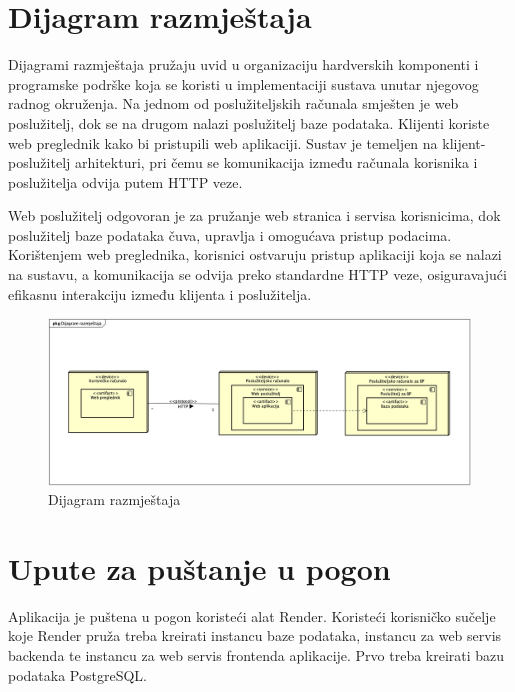 			\eject 
		
		
		\section{Dijagram razmještaja}

			Dijagrami razmještaja pružaju uvid u organizaciju hardverskih komponenti i programske podrške koja se koristi u implementaciji sustava unutar njegovog radnog okruženja. Na jednom od poslužiteljskih računala smješten je web poslužitelj, dok se na drugom nalazi poslužitelj baze podataka. Klijenti koriste web preglednik kako bi pristupili web aplikaciji. Sustav je temeljen na klijent-poslužitelj arhitekturi, pri čemu se komunikacija između računala korisnika i poslužitelja odvija putem HTTP veze.
			
			Web poslužitelj odgovoran je za pružanje web stranica i servisa korisnicima, dok poslužitelj baze podataka čuva, upravlja i omogućava pristup podacima. Korištenjem web preglednika, korisnici ostvaruju pristup aplikaciji koja se nalazi na sustavu, a komunikacija se odvija preko standardne HTTP veze, osiguravajući efikasnu interakciju između klijenta i poslužitelja.
			
			\begin{figure}[H]
				\includegraphics[scale=0.35]{dijagrami/dijagram_razmjestaja.png} %
				\centering
				\caption{Dijagram razmještaja}
				\label{fig:promjene}
			\end{figure}
			
			\eject 
		
		\section{Upute za puštanje u pogon}
		
		Aplikacija je puštena u pogon koristeći alat Render. Koristeći korisničko sučelje koje Render pruža treba kreirati instancu baze podataka, instancu za web servis backenda te instancu za web servis frontenda aplikacije. Prvo treba kreirati bazu podataka PostgreSQL.
			
